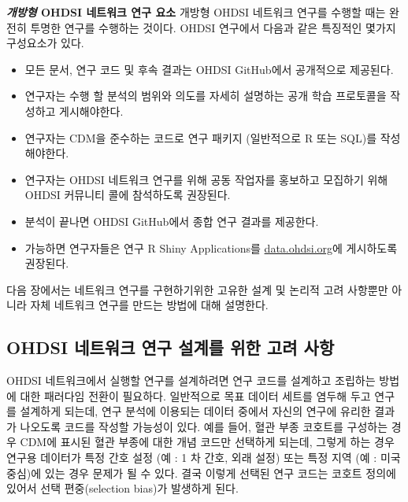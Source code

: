 \documentclass[11pt]{book}
\providecommand{\tightlist}{%
  \setlength{\itemsep}{0pt}\setlength{\parskip}{0pt}}
\theoremstyle{definition}
\theoremstyle{definition}
\theoremstyle{definition}
\theoremstyle{remark}
\begin{document}
\textbf{\emph{개방형} OHDSI 네트워크 연구 요소} 개방형 OHDSI 네트워크
연구를 수행할 때는 완전히 투명한 연구를 수행하는 것이다. OHDSI 연구에서
다음과 같은 특징적인 몇가지 구성요소가 있다.

\begin{itemize}
\tightlist
\item
  모든 문서, 연구 코드 및 후속 결과는 OHDSI GitHub에서 공개적으로
  제공된다.
\item
  연구자는 수행 할 분석의 범위와 의도를 자세히 설명하는 공개 학습
  프로토콜을 작성하고 게시해야한다.
\item
  연구자는 CDM을 준수하는 코드로 연구 패키지 (일반적으로 R 또는 SQL)를
  작성해야한다.
\item
  연구자는 OHDSI 네트워크 연구를 위해 공동 작업자를 홍보하고 모집하기
  위해 OHDSI 커뮤니티 콜에 참석하도록 권장된다.
\item
  분석이 끝나면 OHDSI GitHub에서 종합 연구 결과를 제공한다.
\item
  가능하면 연구자들은 연구 R Shiny Applications를
  \href{http://data.ohdsi.org}{data.ohdsi.org}에 게시하도록 권장된다.
\end{itemize}

다음 장에서는 네트워크 연구를 구현하기위한 고유한 설계 및 논리적 고려
사항뿐만 아니라 자체 네트워크 연구를 만드는 방법에 대해 설명한다.

\subsection{OHDSI 네트워크 연구 설계를 위한 고려
사항}\label{ohdsi------}


OHDSI 네트워크에서 실행할 연구를 설계하려면 연구 코드를 설계하고
조립하는 방법에 대한 패러다임 전환이 필요하다. 일반적으로 목표 데이터
세트를 염두해 두고 연구를 설계하게 되는데, 연구 분석에 이용되는 데이터
중에서 자신의 연구에 유리한 결과가 나오도록 코드를 작성할 가능성이 있다.
예를 들어, 혈관 부종 코호트를 구성하는 경우 CDM에 표시된 혈관 부종에
대한 개념 코드만 선택하게 되는데, 그렇게 하는 경우 연구용 데이터가 특정
간호 설정 (예 : 1 차 간호, 외래 설정) 또는 특정 지역 (예 : 미국 중심)에
있는 경우 문제가 될 수 있다. 결국 이렇게 선택된 연구 코드는 코호트
정의에 있어서 선택 편중(selection bias)가 발생하게 된다.
\end{document}
